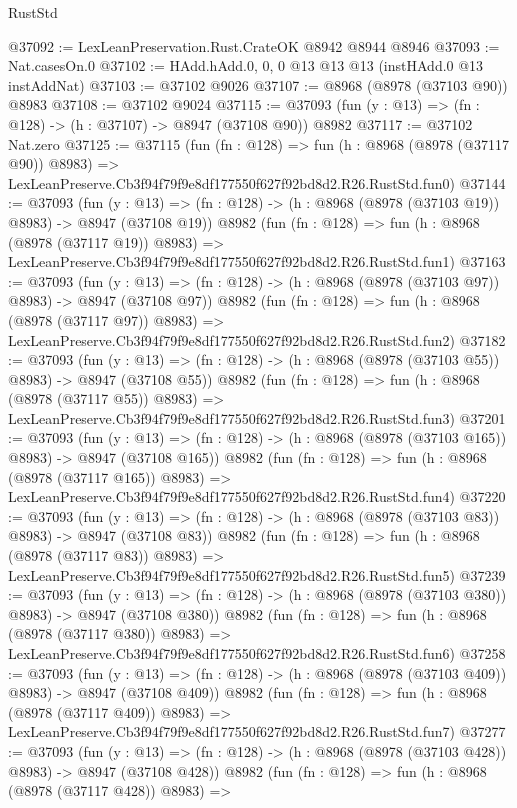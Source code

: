 \begin{lexlean}{RustStd}
\begin{coremodule}
@37092 := LexLeanPreservation.Rust.CrateOK @8942 @8944 @8946
@37093 := Nat.casesOn.{0}
@37102 := HAdd.hAdd.{0, 0, 0} @13 @13 @13 (instHAdd.{0} @13 instAddNat)
@37103 := @37102 @9026
@37107 := @8968 (@8978 (@37103 @90)) @8983
@37108 := @37102 @9024
@37115 := @37093 (fun (y : @13) => (fn : @128) -> (h : @37107) -> @8947 (@37108 @90)) @8982
@37117 := @37102 Nat.zero
@37125 := @37115
    (fun (fn : @128) =>
    fun (h : @8968 (@8978 (@37117 @90)) @8983) =>
    LexLeanPreserve.Cb3f94f79f9e8df177550f627f92bd8d2.R26.RustStd.fun0)
@37144 := @37093
    (fun (y : @13) => (fn : @128) -> (h : @8968 (@8978 (@37103 @19)) @8983) -> @8947 (@37108 @19))
    @8982
    (fun (fn : @128) =>
    fun (h : @8968 (@8978 (@37117 @19)) @8983) =>
    LexLeanPreserve.Cb3f94f79f9e8df177550f627f92bd8d2.R26.RustStd.fun1)
@37163 := @37093
    (fun (y : @13) => (fn : @128) -> (h : @8968 (@8978 (@37103 @97)) @8983) -> @8947 (@37108 @97))
    @8982
    (fun (fn : @128) =>
    fun (h : @8968 (@8978 (@37117 @97)) @8983) =>
    LexLeanPreserve.Cb3f94f79f9e8df177550f627f92bd8d2.R26.RustStd.fun2)
@37182 := @37093
    (fun (y : @13) => (fn : @128) -> (h : @8968 (@8978 (@37103 @55)) @8983) -> @8947 (@37108 @55))
    @8982
    (fun (fn : @128) =>
    fun (h : @8968 (@8978 (@37117 @55)) @8983) =>
    LexLeanPreserve.Cb3f94f79f9e8df177550f627f92bd8d2.R26.RustStd.fun3)
@37201 := @37093
    (fun (y : @13) => (fn : @128) -> (h : @8968 (@8978 (@37103 @165)) @8983) -> @8947 (@37108 @165))
    @8982
    (fun (fn : @128) =>
    fun (h : @8968 (@8978 (@37117 @165)) @8983) =>
    LexLeanPreserve.Cb3f94f79f9e8df177550f627f92bd8d2.R26.RustStd.fun4)
@37220 := @37093
    (fun (y : @13) => (fn : @128) -> (h : @8968 (@8978 (@37103 @83)) @8983) -> @8947 (@37108 @83))
    @8982
    (fun (fn : @128) =>
    fun (h : @8968 (@8978 (@37117 @83)) @8983) =>
    LexLeanPreserve.Cb3f94f79f9e8df177550f627f92bd8d2.R26.RustStd.fun5)
@37239 := @37093
    (fun (y : @13) => (fn : @128) -> (h : @8968 (@8978 (@37103 @380)) @8983) -> @8947 (@37108 @380))
    @8982
    (fun (fn : @128) =>
    fun (h : @8968 (@8978 (@37117 @380)) @8983) =>
    LexLeanPreserve.Cb3f94f79f9e8df177550f627f92bd8d2.R26.RustStd.fun6)
@37258 := @37093
    (fun (y : @13) => (fn : @128) -> (h : @8968 (@8978 (@37103 @409)) @8983) -> @8947 (@37108 @409))
    @8982
    (fun (fn : @128) =>
    fun (h : @8968 (@8978 (@37117 @409)) @8983) =>
    LexLeanPreserve.Cb3f94f79f9e8df177550f627f92bd8d2.R26.RustStd.fun7)
@37277 := @37093
    (fun (y : @13) => (fn : @128) -> (h : @8968 (@8978 (@37103 @428)) @8983) -> @8947 (@37108 @428))
    @8982
    (fun (fn : @128) =>
    fun (h : @8968 (@8978 (@37117 @428)) @8983) =>

\end{coremodule}
\end{lexlean}
